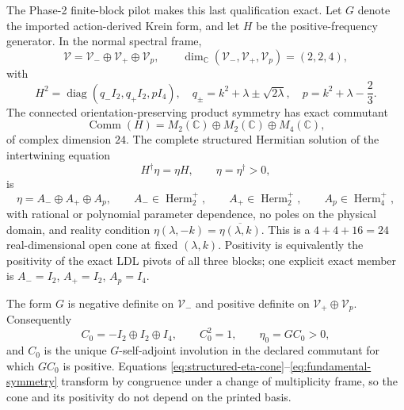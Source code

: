 \documentclass[11pt]{article}
\begin{document}
The Phase-2 finite-block pilot makes this last qualification exact.  Let
$G$ denote the imported action-derived Krein form, and let $H$ be the
positive-frequency generator.  In the normal spectral frame,
\begin{equation}
 \mathcal V=\mathcal V_-
       \oplus\mathcal V_+\oplus\mathcal V_p,
 \qquad \dim_{\mathbb C}(\mathcal V_-,\mathcal V_+,\mathcal V_p)=(2,2,4),
 \label{eq:cpt-spectral-frame}
\end{equation}
with
\begin{equation}
 H^2=\operatorname{diag}(q_-I_2,q_+I_2,pI_4),\quad
 q_\pm=k^2+\lambda\pm\sqrt{2\lambda},\quad
 p=k^2+\lambda-\frac23.
\end{equation}
The connected orientation-preserving product symmetry has exact commutant
\begin{equation}
 \operatorname{Comm}(H)=M_2(\mathbb C)\oplus M_2(\mathbb C)
                         \oplus M_4(\mathbb C),
\end{equation}
of complex dimension $24$.  The complete structured Hermitian solution of
the intertwining equation
\begin{equation}
 H^\dagger\eta=\eta H,
 \qquad \eta=\eta^\dagger>0,
 \label{eq:pseudo-hermitian-metric}
\end{equation}
is
\begin{equation}
 \eta=A_-\oplus A_+\oplus A_p,
 \qquad A_-\in\operatorname{Herm}_2^+,\qquad
 A_+\in\operatorname{Herm}_2^+,\qquad
 A_p\in\operatorname{Herm}_4^+,
 \label{eq:structured-eta-cone}
\end{equation}
with rational or polynomial parameter dependence, no poles on the physical
domain, and reality condition
$\eta(\lambda,-k)=\overline{\eta(\lambda,k)}$.  This is a
$4+4+16=24$ real-dimensional open cone at fixed $(\lambda,k)$.  Positivity
is equivalently the positivity of the exact LDL pivots of all three blocks;
one explicit exact member is $A_-=I_2$, $A_+=I_2$, $A_p=I_4$.

The form $G$ is negative definite on $\mathcal V_-$ and positive definite on
$\mathcal V_+\oplus\mathcal V_p$.  Consequently
\begin{equation}
 C_0=-I_2\oplus I_2\oplus I_4,
 \qquad C_0^2=1,\qquad \eta_0=G C_0>0,
 \label{eq:fundamental-symmetry}
\end{equation}
and $C_0$ is the unique $G$-self-adjoint involution in the declared
commutant for which $GC_0$ is positive.  Equations
\eqref{eq:structured-eta-cone}--\eqref{eq:fundamental-symmetry} transform by
congruence under a change of multiplicity frame, so the cone and its
positivity do not depend on the printed basis.
\end{document}
